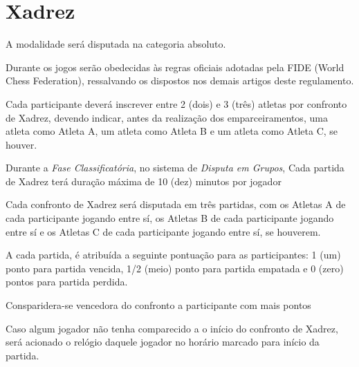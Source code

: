 {\let\clearpage\relax \chapter{Xadrez}}

\begin{article}
	A modalidade será disputada na categoria absoluto.
\end{article}

\begin{article}
	Durante os jogos serão obedecidas às regras oficiais adotadas pela FIDE (World Chess Federation), ressalvando os dispostos nos demais artigos deste regulamento.
\end{article}

\begin{article}
	Cada participante deverá inscrever entre 2 (dois) e 3 (três) atletas por confronto de Xadrez, devendo indicar, antes da realização dos emparceiramentos, uma atleta como Atleta A, um atleta como Atleta B e um atleta como Atleta C, se houver.
\end{article}

\begin{article}
	Durante a \textit{Fase Classificatória}, no sistema de \textit{Disputa em Grupos}, Cada partida de Xadrez terá duração máxima de 10 (dez) minutos por jogador
\end{article}

\begin{article}
	Cada confronto de Xadrez será disputada em três partidas, com os Atletas A de cada participante jogando entre sí, os Atletas B de cada participante jogando entre sí e os Atletas C de cada participante jogando entre sí, se houverem.

	\begin{xparagraph}
		A cada partida, é atribuída a seguinte pontuação para as participantes: 1 (um) ponto para partida vencida, 1/2 (meio) ponto para partida empatada e 0 (zero) pontos para partida perdida.
	\end{xparagraph}

	\begin{xparagraph}
		Consparidera-se vencedora do confronto a participante com mais pontos
	\end{xparagraph}

	\begin{xparagraph}
		Caso algum jogador não tenha comparecido a o início do confronto de Xadrez, será acionado o relógio daquele jogador no horário marcado para início da partida.
	\end{xparagraph}
\end{article}

